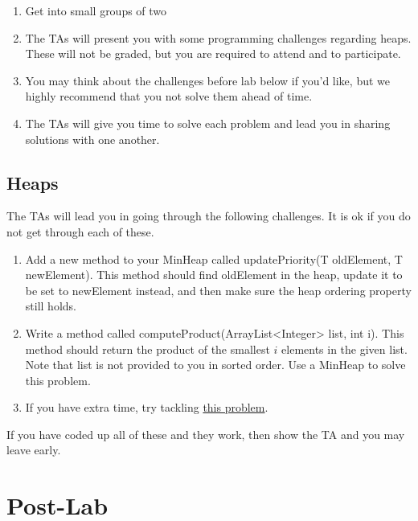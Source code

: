 \documentclass[paper=a4, fontsize=11pt, parskip=full]{scrartcl} %
\numberwithin{equation}{section} %
\numberwithin{figure}{section} %
\numberwithin{table}{section} %
\begin{document}
\begin{enumerate}
	\item Get into small groups of two
	\item The TAs will present you with some programming challenges regarding heaps. These will not be graded, but you are required to attend and to participate.
	\item You may think about the challenges before lab below if you'd like, but we highly recommend that you not solve them ahead of time.
	\item The TAs will give you time to solve each problem and lead you in sharing solutions with one another.
\end{enumerate}

\subsection{Heaps}

The TAs will lead you in going through the following challenges. It is ok if you do not get through each of these.

\begin{enumerate}
	\item Add a new method to your MinHeap called updatePriority(T oldElement, T newElement). This method should find oldElement in the heap, update it to be set to newElement instead, and then make sure the heap ordering property still holds.
	\item Write a method called computeProduct(ArrayList<Integer> list, int i). This method should return the product of the smallest $i$ elements in the given list. Note that list is not provided to you in sorted order. Use a MinHeap to solve this problem.
	\item If you have extra time, try tackling \href{https://www.hackerearth.com/practice/data-structures/trees/heapspriority-queues/practice-problems/algorithm/haunted/}{this problem}.
\end{enumerate}

If you have coded up all of these and they work, then show the TA and you may leave early.




\newpage
\section{Post-Lab}
\end{document}
